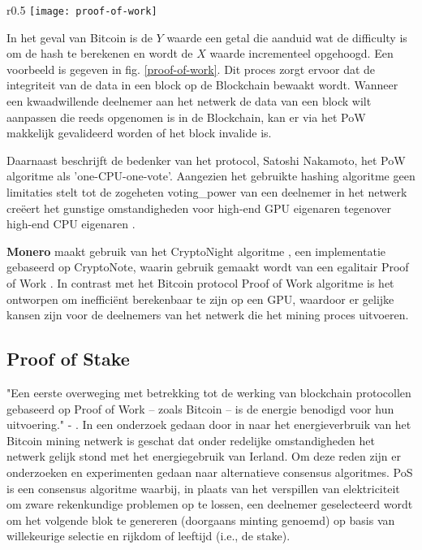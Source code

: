 \begin{wrapfigure}{r}{0.5\textwidth}
  \texttt{[image: proof-of-work]}
  \caption{Werking Proof-of-Work, van \citet{ProofofWork}. Wanneer de eerste vier bits ($Y = 4$) van de hash 0 zijn is de proef opgelost. }
  \label{proof-of-work}    
\end{wrapfigure}
In het geval van Bitcoin is de $Y$ waarde een getal die aanduid wat de \gls{difficulty} is om de hash te berekenen en wordt de $X$ waarde incrementeel opgehoogd. Een voorbeeld is gegeven in fig. \ref{proof-of-work}. Dit proces zorgt ervoor dat de integriteit van de data in een block op de Blockchain bewaakt wordt. Wanneer een kwaadwillende deelnemer aan het netwerk de data van een block wilt aanpassen die reeds opgenomen is in de Blockchain, kan er via het \acrshort{PoW} makkelijk gevalideerd worden of het block invalide is.

Daarnaast beschrijft de bedenker van het protocol, Satoshi Nakamoto, het \acrshort{PoW} algoritme als 'one-CPU-one-vote'. Aangezien het gebruikte hashing algoritme geen limitaties stelt tot de zogeheten \gls{voting_power} van een deelnemer in het netwerk creëert het gunstige omstandigheden voor high-end GPU eigenaren tegenover high-end CPU eigenaren \citep[p.~2]{van2013cryptonote}.

\textbf{Monero} maakt gebruik van het CryptoNight algoritme \citep{noether2014monero}, een implementatie gebaseerd op CryptoNote, waarin gebruik gemaakt wordt van een egalitair Proof of Work \citep[p.~11]{van2013cryptonote}. In contrast met het Bitcoin protocol Proof of Work algoritme is het ontworpen om inefficiënt berekenbaar te zijn op een GPU, waardoor er gelijke kansen zijn voor de deelnemers van het netwerk die het mining proces uitvoeren.

\newpage
\subsection{Proof of Stake}

"Een eerste overweging met betrekking tot de werking van blockchain protocollen gebaseerd op Proof of Work -- zoals Bitcoin -- is de energie benodigd voor hun uitvoering." - \citet{kiayias2017ouroboros}.
In een onderzoek gedaan door \citeauthor{ODwyer:Bitcoin} in \citeyear{ODwyer:Bitcoin} naar het energieverbruik van het Bitcoin mining netwerk is geschat dat onder redelijke omstandigheden het netwerk gelijk stond met het energiegebruik van Ierland. Om deze reden zijn er onderzoeken en experimenten gedaan naar alternatieve consensus algoritmes. \acrfull{PoS} is een consensus algoritme waarbij, in plaats van het verspillen van elektriciteit om zware rekenkundige problemen op te lossen, een deelnemer geselecteerd wordt om het volgende blok te genereren (doorgaans \gls{minting} genoemd) op basis van willekeurige selectie en rijkdom of leeftijd (i.e., de stake).

